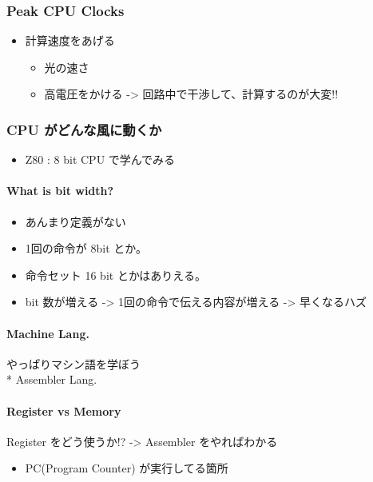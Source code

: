 \documentclass{jsarticle}
\begin{document}
\subsubsection{Peak CPU Clocks}

\begin{itemize}
\item
  計算速度をあげる
  \begin{itemize}
  \item
    光の速さ
  \item
    高電圧をかける -\textgreater{} 回路中で干渉して、計算するのが大変!!
  \end{itemize}
\end{itemize}
\subsubsection{CPU がどんな風に動くか}

\begin{itemize}
\item
  Z80 : 8 bit CPU で学んでみる
\end{itemize}
\paragraph{What is bit width?}

\begin{itemize}
\item
  あんまり定義がない
\item
  1回の命令が 8bit とか。
\item
  命令セット 16 bit とかはありえる。
\item
  bit 数が増える -\textgreater{} 1回の命令で伝える内容が増える
  -\textgreater{} 早くなるハズ
\end{itemize}
\paragraph{Machine Lang.}

やっぱりマシン語を学ぼう\\* Assembler Lang.

\paragraph{Register vs Memory}

Register をどう使うか!? -\textgreater{} Assembler をやればわかる

\begin{itemize}
\item
  PC(Program Counter) が実行してる箇所
\end{itemize}
\end{document}
